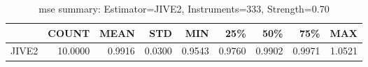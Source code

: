 \begin{table}[ht]
\centering
\caption{mse summary: Estimator=JIVE2, Instruments=333, Strength=0.70}
\begin{tabular}{lrrrrrrrr}
\toprule
 & COUNT & MEAN & STD & MIN & 25\% & 50\% & 75\% & MAX \\
\midrule
JIVE2 & 10.0000 & 0.9916 & 0.0300 & 0.9543 & 0.9760 & 0.9902 & 0.9971 & 1.0521 \\
\bottomrule
\end{tabular}
\end{table}
